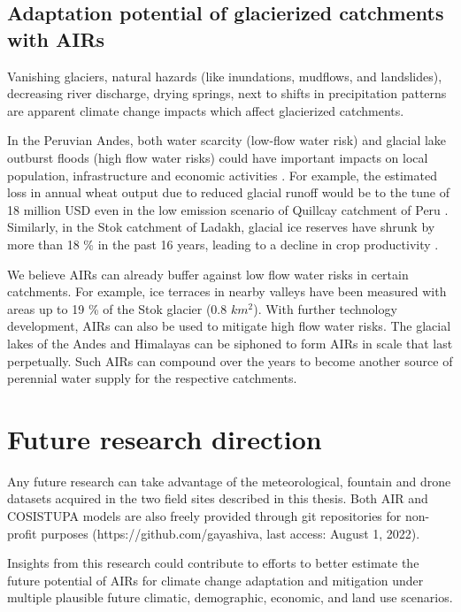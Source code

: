 \subsection{Adaptation potential of glacierized catchments with AIRs}

Vanishing glaciers, natural hazards (like inundations, mudflows, and landslides), decreasing river discharge,
drying springs, next to shifts in precipitation patterns are apparent climate change impacts which affect
glacierized catchments.

In the Peruvian Andes, both water scarcity (low-flow water risk) and glacial lake outburst floods (high flow
water risks) could have important impacts on local population, infrastructure and economic activities
\citep{motschmannIntegratedAssessmentsWater2020}. For example, the estimated loss in annual wheat output due to
reduced glacial runoff would be to the tune of 18 million USD even in the low emission scenario of Quillcay catchment
of Peru \citep{motschmannLossesDamagesConnected2020}. Similarly, in the Stok catchment of Ladakh, glacial ice
reserves have shrunk by more than 18 \% in the past 16 years, leading to a decline in crop productivity
\citep{sohebSpatiotemporalQuantificationKey2022}. 

We believe AIRs can already buffer against low flow water risks in certain catchments. For example, ice
terraces in nearby valleys have been measured with areas up to 19 \% of the Stok glacier (0.8 $km^2$). With further technology
development, AIRs can also be used to mitigate high flow water risks. The glacial lakes of the Andes and
Himalayas can be siphoned to form AIRs in scale that last perpetually. Such AIRs can compound over the years to
become another source of perennial water supply for the respective catchments.

\section{Future research direction}

Any future research can take advantage of the meteorological, fountain and drone datasets acquired in the two field
sites described in this thesis. Both AIR and COSISTUPA models are also freely provided through git repositories
for non-profit purposes (https://github.com/gayashiva, last access: August 1, 2022).

Insights from this research could contribute to efforts to better estimate the future potential of AIRs for
climate change adaptation and mitigation under multiple plausible future climatic, demographic, economic, and
land use scenarios. 

